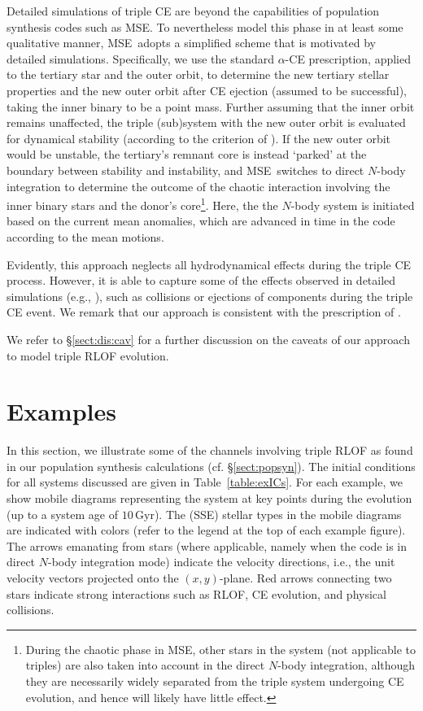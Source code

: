 \documentclass[twocolumn,appendixfloats,tighten]{aastex631}
\newcommand{\gyr}{\mathrm{Gyr}}
\newcommand{\mse}{\textsc{MSE}}
\begin{document}
Detailed simulations of triple CE are beyond the capabilities of population synthesis codes such as \mse. To nevertheless model this phase in at least some qualitative manner, \mse~adopts a simplified scheme that is motivated by detailed simulations. Specifically, we use the standard $\alpha$-CE prescription, applied to the tertiary star and the outer orbit, to determine the new tertiary stellar properties and the new outer orbit after CE ejection (assumed to be successful), taking the inner binary to be a point mass. Further assuming that the inner orbit remains unaffected, the triple (sub)system with the new outer orbit is evaluated for dynamical stability (according to the criterion of \citealt{2001MNRAS.321..398M}). If the new outer orbit would be unstable, the tertiary's remnant core is instead `parked' at the boundary between stability and instability, and \mse~switches to direct $N$-body integration to determine the outcome of the chaotic interaction involving the inner binary stars and the donor's core\footnote{During the chaotic phase in \mse, other stars in the system (not applicable to triples) are also taken into account in the direct $N$-body integration, although they are necessarily widely separated from the triple system undergoing CE evolution, and hence will likely have little effect.}. Here, the the $N$-body system is initiated based on the current mean anomalies, which are advanced in time in the code according to the mean motions. 

Evidently, this approach neglects all hydrodynamical effects during the triple CE process. However, it is able to capture some of the effects observed in detailed simulations (e.g., \citealt{2021MNRAS.500.1921G}), such as collisions or ejections of components during the triple CE event. We remark that our approach is consistent with the prescription of \citet{2020MNRAS.498.2957C}. 

We refer to \S\ref{sect:dis:cav} for a further discussion on the caveats of our approach to model triple RLOF evolution.



\section{Examples}
\label{sect:ex}

In this section, we illustrate some of the channels involving triple RLOF as found in our population synthesis calculations (cf. \S\ref{sect:popsyn}). The initial conditions for all systems discussed are given in Table~\ref{table:exICs}. For each example, we show mobile diagrams \citep{1968QJRAS...9..388E} representing the system at key points during the evolution (up to a system age of $10\,\gyr$). The (\textsc{SSE}) stellar types in the mobile diagrams are indicated with colors (refer to the legend at the top of each example figure). The arrows emanating from stars (where applicable, namely when the code is in direct $N$-body integration mode) indicate the velocity directions, i.e., the unit velocity vectors projected onto the $(x,y)$-plane. Red arrows connecting two stars indicate strong interactions such as RLOF, CE evolution, and physical collisions.
\end{document}
